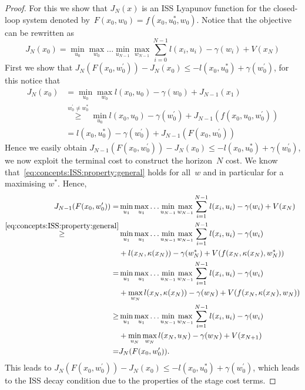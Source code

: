 \begin{proof}
For this we show that $J_N(x)$ is an ISS Lyapunov function for the closed-loop system denoted by~$F(x_0,w_0) 
= f(x_0,u_0^\ast,w_0)$.
%
Notice that the objective can be rewritten as
%
\begin{equation}
	J_N(x_0) = \min_{u_0}\max_{w_0}\dots\min_{u_{N-1}}\max_{w_{N-1}} \sum_{i=0}^{N-1}l(x_i,u_i)-\gamma(w_i) + V(x_N)
\end{equation}
%
First we show that $J_N(F(x_0,w_0^\prime))-J_N(x_0)\leq-l(x_0,u_0^\ast)+\gamma(w_0^\prime)$, for this notice
that
% 
\begin{equation}\begin{split}
	J_N(x_0) &= \min_{u_0}\max_{w_0} l(x_0,u_0)-\gamma(w_0) + J_{N-1}(x_1)\\
		&\overset{w_0^\prime\neq w_0^\ast}{\geq} \min_{u_0} l(x_0,u_0)-\gamma(w_0^\prime) + J_{N-1}(f(x_0,u_0,w_0^\prime))\\
		&= l(x_0,u_0^\ast)-\gamma(w_0^\prime) + J_{N-1}(F(x_0,w_0^\prime))
\end{split}\end{equation}
%
Hence we easily obtain $J_{N-1}(F(x_0,w_0^\prime))-J_N(x_0)\leq-l(x_0,u_0^\ast)+\gamma(w_0^\prime)$,
we now exploit the terminal cost to construct the horizon~$N$ cost.
%
We know that~\eqref{eq:concepts:ISS:property:general} holds for all~$w$ and in particular for a maximising
$w^\ast$.
%
Hence,
%
\begin{equation}\begin{split}
	J_{N-1}(F(x_0,w_0^\prime)) = &\min_{u_1}\max_{u_1}\dots\min_{u_{N-1}}\max_{w_{N-1}} \sum_{i=1}^{N-1}l(x_i,u_i)-\gamma(w_i)+V(x_N)\\
	\overset{\eqref{eq:concepts:ISS:property:general}}{\geq} &\min_{u_1}\max_{u_1}\dots\min_{u_{N-1}}\max_{w_{N-1}} 
	\sum_{i=1}^{N-1}l(x_i,u_i)-\gamma(w_i)\\
	&+ l(x_N,\kappa(x_N)) -\gamma(w_N^\ast) + V(f(x_N,\kappa(x_N),w_N^\ast))\\
	= &\min_{u_1}\max_{u_1}\dots\min_{u_{N-1}}\max_{w_{N-1}} 
	\sum_{i=1}^{N-1}l(x_i,u_i)-\gamma(w_i)\\
	&+ \max_{w_N} l(x_N,\kappa(x_N)) -\gamma(w_N) + V(f(x_N,\kappa(x_N),w_N))\\
	\geq &\min_{u_1}\max_{u_1}\dots\min_{u_{N-1}}\max_{w_{N-1}} 
	\sum_{i=1}^{N-1}l(x_i,u_i)-\gamma(w_i)\\
	&+ \min_{u_N}\max_{w_N} l(x_N,u_N) -\gamma(w_N) + V(x_{N+1})\\
	= &J_{N}(F(x_0,w_0^\prime)).
\end{split}\end{equation}
%
This leads to $J_N(F(x_0,w_0^\prime))-J_N(x_0)\leq-l(x_0,u_0^\ast)+\gamma(w_0^\prime)$, which leads to the 
ISS decay condition due to the properties of the stage cost terms.
%

\end{proof}